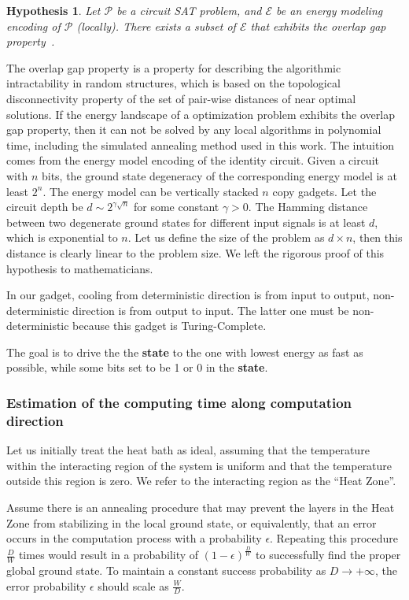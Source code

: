 \documentclass[twocolumn,superscriptaddress,english,showpacs,longbibliography]{revtex4-2}
\newtheorem{hyp}{Hypothesis}
\begin{document}
\begin{hyp}
Let $\mathcal{P}$ be a circuit SAT problem, and $\mathcal{E}$ be an energy modeling encoding of $\mathcal{P}$ (locally). There exists a subset of $\mathcal{E}$ that exhibits the overlap gap property~\cite{Gamarnik2021}.
\end{hyp}
The overlap gap property is a property for describing the algorithmic intractability in random structures, which is based on the topological disconnectivity property of the set of pair-wise distances of near optimal solutions.
If the energy landscape of a optimization problem exhibits the overlap gap property, then it can not be solved by any local algorithms in polynomial time, including the simulated annealing method used in this work.
The intuition comes from the energy model encoding of the identity circuit.
Given a circuit with $n$ bits, the ground state degeneracy of the corresponding energy model is at least $2^n$.
The energy model can be vertically stacked $n$ copy gadgets.
Let the circuit depth be $d \sim 2^{\gamma \sqrt{n}}$ for some constant $\gamma > 0$.
The Hamming distance between two degenerate ground states for different input signals is at least $d$, which is exponential to $n$. Let us define the size of the problem as $d\times n$, then this distance is clearly linear to the problem size. We left the rigorous proof of this hypothesis to mathematicians.

In our gadget, cooling from deterministic direction is from input to
output, non-deterministic direction is from output to input. The latter
one must be non-deterministic because this gadget is Turing-Complete.

The goal is to drive the the \textbf{state} to the one with lowest energy as fast as possible, while some bits set to be 1 or 0 in the \textbf{state}.

\subsubsection{Estimation of the computing time along computation direction}\label{estimation-of-the-computing-time}

Let us initially treat the heat bath as ideal, assuming that the temperature within the interacting region of the system is uniform and that the temperature outside this region is zero. We refer to the interacting region as the ``Heat Zone''.

Assume there is an annealing procedure that may prevent the layers in the Heat Zone from stabilizing in the local ground state, or equivalently, that an error occurs in the computation process with a probability $\epsilon$. Repeating this procedure $\frac{D}{W}$ times would result in a probability of $(1-\epsilon)^{\frac{D}{W}}$ to successfully find the proper global ground state. To maintain a constant success probability as $D \rightarrow +\infty$, the error probability $\epsilon$ should scale as $\frac{W}{D}$.
\end{document}
